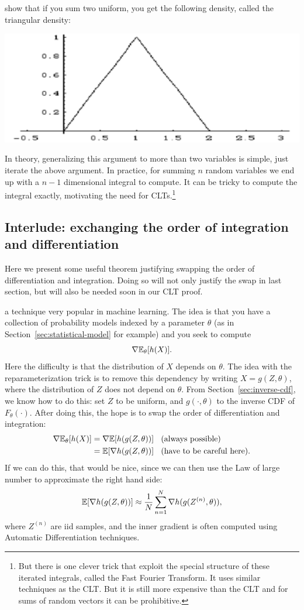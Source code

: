\documentclass{article}
\begin{document}
 show that if you sum two uniform, you get the following density, called the triangular density:
\begin{center}
	\includegraphics[width=0.3\linewidth]{figures/triangular} 
\end{center}

 In theory, generalizing this argument to more than two variables is simple, just iterate the above argument. In practice, for summing $n$ random variables we end up with a $n-1$ dimensional integral to compute. It can be tricky to compute the integral exactly, motivating the need for CLTs.\footnote{But there is one clever trick that exploit the special structure of these iterated integrals, called the Fast Fourier Transform. It uses similar techniques as the CLT. But it is still more expensive than the CLT and for sums of random vectors it can be prohibitive.}


\subsection{Interlude: exchanging the order of integration and differentiation}\label{sec:exchange}

Here we present some useful theorem justifying swapping the order of differentiation and integration. Doing so will not only justify the swap in last section, but will also be needed soon in our CLT proof. 

 a technique very popular in machine learning. The idea is that you have a collection of probability models indexed by a parameter $\theta$ (as in Section~\ref{sec:statistical-model} for example) and you seek to compute
\[ \nabla {\mathbb E}_\theta [h(X)]. \] 
Here the difficulty is that the distribution of $X$ depends on $\theta$. The idea with the reparameterization trick is to remove this dependency by writing $X = g(Z, \theta)$, where the distribution of $Z$ does not depend on $\theta$. From Section~\ref{sec:inverse-cdf}, we know how to do this: set $Z$ to be uniform, and $g(\cdot, \theta)$ to the inverse CDF of $F_\theta(\cdot)$. After doing this, the hope is to swap the order of differentiation and integration:
\begin{align*}
\nabla {\mathbb E}_\theta [h(X)] &= \nabla {\mathbb E} [h(g(Z,\theta))] \;\;\text{ (always possible)} \\
&=  {\mathbb E} [\nabla h(g(Z,\theta))] \;\;\text{ (have to be careful here).}
\end{align*}
If we can do this, that would be nice, since we can then use the Law of large number to approximate the right hand side:
\[ {\mathbb E} [\nabla h(g(Z,\theta))] \approx \frac{1}{N} \sum_{n=1}^N \nabla h(g(Z^{(n)},\theta)),  \]
where $Z^{(n)}$ are iid samples, and the inner gradient is often computed using Automatic Differentiation techniques.
\end{document}
